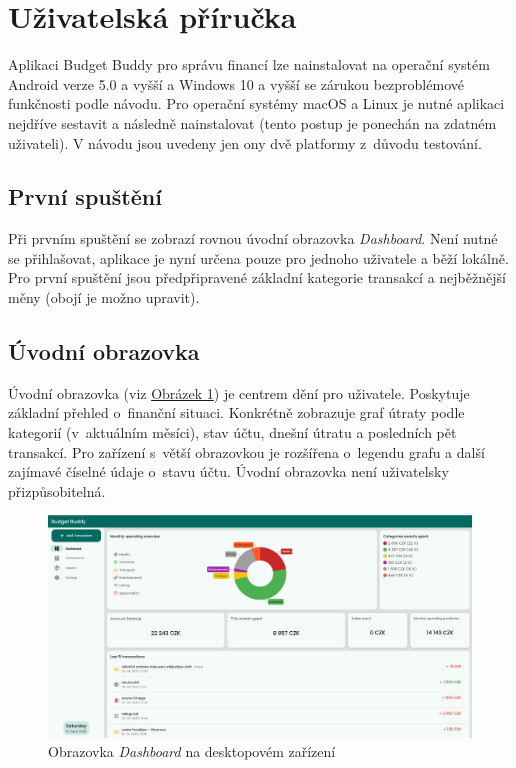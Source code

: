 \documentclass[
  biblatex,
  figures=true,
  tables=false,
  glossaries,
  index
]{kidiplom}
\begin{document}
\section{Uživatelská příručka}
Aplikaci Budget Buddy pro správu financí lze nainstalovat na operační systém Android verze 5.0 a vyšší a Windows 10 a vyšší se zárukou bezproblémové funkčnosti podle návodu. Pro operační systémy macOS a Linux je nutné aplikaci nejdříve sestavit a následně nainstalovat (tento postup je ponechán na zdatném uživateli). V návodu jsou uvedeny jen ony dvě platformy z~důvodu testování. 

\subsection{První spuštění}
Při prvním spuštění se zobrazí rovnou úvodní obrazovka \textit{Dashboard}. Není nutné se přihlašovat, aplikace je nyní určena pouze pro jednoho uživatele a běží lokálně. Pro první spuštění jsou předpřipravené základní kategorie transakcí a nejběžnější měny (obojí je možno upravit). 

\subsection{Úvodní obrazovka}
Úvodní obrazovka (viz \hyperref[fig:dashboard-large]{Obrázek \ref{fig:dashboard-large}}) je centrem dění pro uživatele. Poskytuje základní přehled o~finanční situaci. Konkrétně zobrazuje graf útraty podle kategorií (v~aktuálním měsíci), stav účtu, dnešní útratu a posledních pět transakcí. Pro zařízení s~větší obrazovkou je rozšířena o~legendu grafu a další zajímavé číselné údaje o~stavu účtu. Úvodní obrazovka není uživatelsky přizpůsobitelná.

\begin{figure}
  \centering
  \includegraphics[width=\textwidth]{images/dashboard-large.png}
  \caption{Obrazovka \textit{Dashboard} na desktopovém zařízení}
  \label{fig:dashboard-large}
\end{figure}
\end{document}
